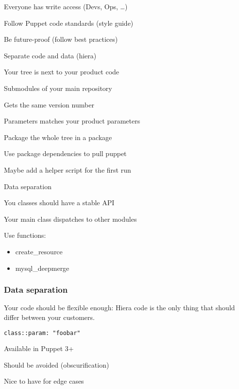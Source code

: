 \begin{iframe}
\item Everyone has write access (Devs, Ops, \dots)
\item Follow Puppet code standards (style guide)
\item Be future-proof (follow best practices)
\item Separate code and data (hiera)
\end{iframe}

\begin{iframe}
\item Your tree is next to your product code
\item Submodules of your main repository
\item Gets the same version number
\item Parameters matches your product parameters
\end{iframe}

\begin{iframe}
\item Package the whole tree in a package
\item Use package dependencies to pull puppet
\item Maybe add a helper script for the first run
\end{iframe}

\begin{iframe}[Hiera]
\item Data separation
\item You classes should have a stable API
\item Your main class dispatches to other modules
\item Use functions:
\begin{itemize}
    \item create\_resource
    \item mysql\_deepmerge
\end{itemize}
\end{iframe}

\begin{frame}
    \frametitle{Data separation}
    \huge Your code should be flexible enough: Hiera code is the only thing that should differ between your customers.
\end{frame}

\begin{iframe}
\item{\texttt{class::param: "foobar"}}
\item Available in Puppet 3+
\item Should be avoided (obscurification)
\item Nice to have for edge cases
\end{iframe}

